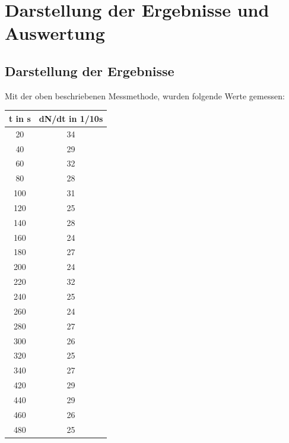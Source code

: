 \section{Darstellung der Ergebnisse und Auswertung}

\subsection{Darstellung der Ergebnisse}
Mit der oben beschriebenen Messmethode, wurden folgende Werte gemessen:
\begin{table}
\centering
\begin{tabular}{c|c}
t in s & dN/dt in 1/10s \\ 
\toprule
20	&34\\ 

40	&29\\ 

60	&32\\ 

80	&28\\ 

100	&31\\ 

120	&25\\ 

140	&28\\ 

160	&24\\ 

180	&27\\ 

200	&24\\ 

220	&32\\ 

240	&25\\ 

260	&24\\ 

280	&27\\ 
	
300	&26\\ 

320	&25\\ 

340	&27\\ 

420	&29\\ 
	
440	&29\\ 

460	&26\\ 

480	&25\\ 


\end{tabular}
\end{table}
